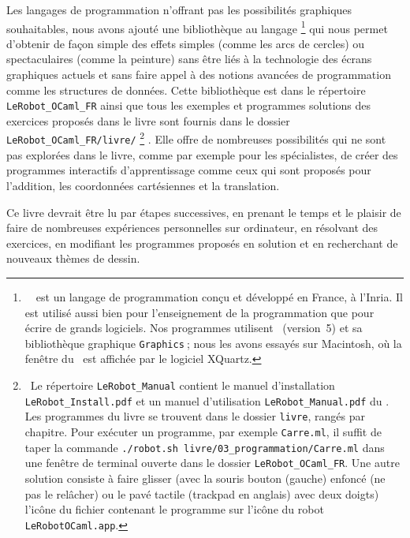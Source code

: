 Les langages de programmation n'offrant pas les possibilités graphiques 
souhaitables, nous avons ajouté une bi\-blio\-thè\-que au langage \ocaml\@%
%
\footnote{\ \ocaml\ est un langage de programmation conçu et développé en France, à 
l'Inria. Il est utilisé aussi bien pour l'enseignement de la programmation que pour 
écrire de grands logiciels. Nos programmes utilisent \ocaml\ (version~5) et sa 
bibliothèque graphique {\tt Graphics}$\:$; nous les avons essayés sur Macintosh, où la fenêtre 
du \robot\ est affichée par le logiciel XQuartz.}
%
qui nous permet
d'obtenir de façon simple des effets simples (comme les arcs de cercles) ou
spectaculaires (comme la peinture) sans être liés à la technologie des
écrans graphiques actuels et sans faire appel à des notions avancées de
programmation comme les structures de données. Cette bibliothèque est dans
le répertoire \texttt{LeRobot\_OCaml\_FR} ainsi
que tous les exemples et programmes solutions des exercices proposés dans le livre
sont fournis dans le dossier {\tt LeRobot\_OCaml\_FR/livre/}%
%
\footnote{\ Le répertoire \texttt{LeRobot\_Manual} contient le manuel d'installation 
\texttt{LeRobot\_Install.pdf} et un manuel d'utilisation \texttt{LeRobot\_Manual.pdf} du \robot. Les programmes du livre se trouvent dans le dossier 
{\tt livre}, rangés par chapitre. Pour exécuter un programme, par exemple 
{\tt Carre.ml}, il suffit de taper la commande {\tt ./robot.sh livre/03\_programmation/Carre.ml} 
dans une fenêtre de terminal ouverte dans le dossier {\tt LeRobot\_OCaml\_FR}. Une autre solution
consiste à faire glisser (avec la souris bouton (gauche) enfoncé (ne pas le relâcher) ou le pavé tactile (trackpad en anglais) avec deux doigts) l'icône du fichier contenant le programme sur l'icône du robot \texttt{LeRobotOCaml.app}.}%
. Elle offre de nombreuses possibilités qui ne sont pas explorées dans le livre,
comme par exemple pour les spécialistes, de créer des programmes interactifs d'apprentissage
comme ceux qui sont proposés pour l'addition, les coordonnées cartésiennes et la
translation.

\medskip

Ce livre devrait être lu par étapes successives, en prenant le temps et le plaisir 
de faire de nombreuses expériences personnelles sur ordinateur, en résolvant des exercices,
en modifiant les programmes proposés en solution et en
recherchant de nouveaux thèmes de dessin.


\vspace{1.0cm}

